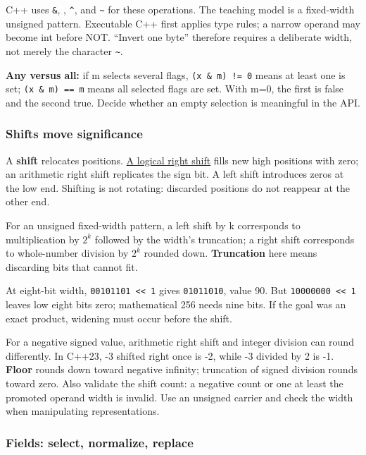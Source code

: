 C++ uses \texttt{\&}, \texttt{\textbar{}}, \texttt{\^{}}, and \texttt{\textasciitilde{}} for these operations. The teaching model is a fixed-width unsigned pattern. Executable C++ first applies type rules; a narrow operand may become int before NOT. ``Invert one byte'' therefore requires a deliberate width, not merely the character \texttt{\textasciitilde{}}.

\textbf{Any versus all:} if m selects several flags, \texttt{(x\ \&\ m)\ !=\ 0} means at least one is set; \texttt{(x\ \&\ m)\ ==\ m} means all selected flags are set. With m=0, the first is false and the second true. Decide whether an empty selection is meaningful in the API.

\subsubsection{Shifts move significance}\label{01-foundations-i-ch001-shifts-move-significance}

\hypertarget{01-foundations-i-ch001-shifts-move-significance}{}

A \textbf{shift} relocates positions. \hyperref[appendix-73425b25118e]{A logical right shift} fills new high positions with zero; an arithmetic right shift replicates the sign bit. A left shift introduces zeros at the low end. Shifting is not rotating: discarded positions do not reappear at the other end.

For an unsigned fixed-width pattern, a left shift by k corresponds to multiplication by \(2^k\) followed by the width's truncation; a right shift corresponds to whole-number division by \(2^k\) rounded down. \textbf{Truncation} here means discarding bits that cannot fit.

At eight-bit width, \texttt{00101101\ \textless{}\textless{}\ 1} gives \texttt{01011010}, value 90. But \texttt{10000000\ \textless{}\textless{}\ 1} leaves low eight bits zero; mathematical 256 needs nine bits. If the goal was an exact product, widening must occur before the shift.

For a negative signed value, arithmetic right shift and integer division can round differently. In C++23, -3 shifted right once is -2, while -3 divided by 2 is -1. \textbf{Floor} rounds down toward negative infinity; truncation of signed division rounds toward zero. Also validate the shift count: a negative count or one at least the promoted operand width is invalid. Use an unsigned carrier and check the width when manipulating representations.

\subsubsection{Fields: select, normalize, replace}\label{01-foundations-i-ch001-fields-select-normalize-replace}

